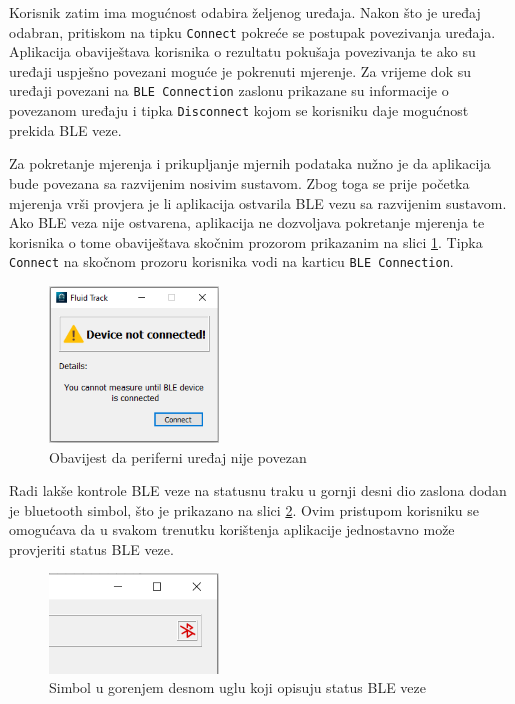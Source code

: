 \documentclass[../diplomski_rad.tex]{subfiles}
\begin{document}
Korisnik zatim ima mogućnost odabira željenog uređaja. Nakon što je uređaj odabran, pritiskom na tipku \texttt{Connect} 
pokreće se postupak povezivanja uređaja. 
Aplikacija obaviještava korisnika o rezultatu pokušaja povezivanja te ako su uređaji uspješno povezani moguće je pokrenuti mjerenje.  
Za vrijeme dok su uređaji povezani na \texttt{BLE Connection} zaslonu prikazane su informacije o povezanom uređaju 
i tipka \texttt{Disconnect} kojom se korisniku daje mogućnost prekida BLE veze.

Za pokretanje mjerenja i prikupljanje mjernih podataka nužno je da aplikacija bude povezana sa razvijenim nosivim sustavom. 
Zbog toga se prije početka mjerenja vrši provjera je li aplikacija ostvarila BLE vezu sa razvijenim sustavom. 
Ako BLE veza nije ostvarena, aplikacija ne dozvoljava pokretanje mjerenja te korisnika o tome obaviještava 
skočnim prozorom prikazanim na slici \ref{slk:ble_not_connected}. Tipka \texttt{Connect} na skočnom prozoru korisnika 
vodi na karticu \texttt{BLE Connection}.

\begin{figure}[htb]
    \centering
    \includegraphics[width=0.4\textwidth]{Figures/ble_not_connected.png} 
    \caption{Obavijest da periferni uređaj nije povezan}
    \label{slk:ble_not_connected}
\end{figure}

Radi lakše kontrole BLE veze na statusnu traku u gornji desni dio zaslona dodan je bluetooth simbol, 
što je prikazano na slici \ref{slk:ble_status}.  
Ovim pristupom korisniku se omogućava da u svakom trenutku korištenja aplikacije jednostavno može provjeriti status BLE veze. 

\begin{figure}[htb]
    \centering
    \includegraphics[width=0.4\textwidth]{Figures/cosak.png} 
    \caption{Simbol u gorenjem desnom uglu koji opisuju status BLE veze}
    \label{slk:ble_status}
\end{figure}
\end{document}
